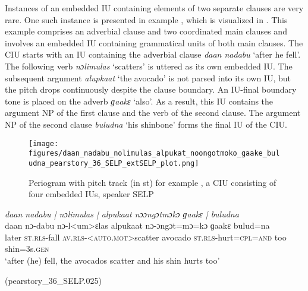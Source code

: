 Instances of an embedded IU containing elements of two separate clauses are very rare. One such instance is presented in example , which is visualized in  . This example comprises an adverbial clause and two coordinated main clauses and involves an embedded IU containing grammatical units of both main clauses. The CIU starts with an IU containing the adverbial clause \textit{daan nadabu}  `after he fell'. The following verb \textit{nɔlimulas} `scatters' is uttered as its own embedded IU. The subsequent argument \textit{alupkaat} `the avocado' is not parsed into its own IU, but the pitch drops continuously despite the clause boundary. An IU-final boundary tone is placed on the adverb \textit{ɡaakɛ} `also'. As a result, this IU contains the argument NP of the first clause and the verb of the second clause. The argument NP of the second clause \textit{buludna} `his shinbone' forms the final IU of the CIU.



\begin{figure}
	\texttt{[image: figures/daan\_nadabu\_nolimulas\_alpukat\_noongotmoko\_gaake\_buludna\_pearstory\_36\_SELP\_extSELP\_plot.png]}
	\caption{Periogram with pitch track (in st) for example , a CIU consisting of four embedded IUs, speaker SELP}
	\label{pitch:aan nadabu nolimulas alpukat noongotmoko gaake buludna}
\end{figure}

\newpage
\ea
\label{ex:aan nadabu nolimulas alpukat noongotmoko gaake buludna}
\textit{daan nadabu | nɔlimulas | alpukaat nɔɔngɔtmɔkɔ ɡaakɛ | buludna} \\
\gll daan nɔ-dabu nɔ-l<um>ɛlas alpukaat nɔ-ɔngɔt=mɔ=kɔ ɡaakɛ bulud=na	 \\
later \textsc{st.rls-}fall \textsc{av.rls-}\textsc{<auto.mot>}scatter avocado \textsc{st.rls-}hurt\textsc{=cpl=and} too shin=3s.\textsc{gen}\\
\glt ‘after (he) fell, the avocados scatter and his shin hurts too’ \begin{flushright}(pearstory\_36\_SELP.025)
\end{flushright}
\z



